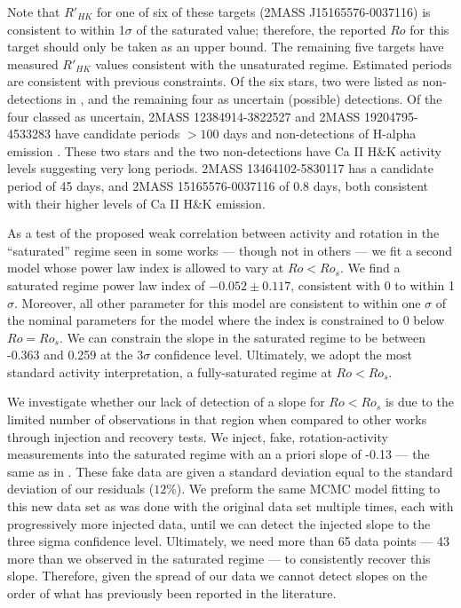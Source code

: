 Note that $R'_{HK}$ for one of six of these targets (2MASS
J15165576-0037116) is consistent to within 1$\sigma$ of the saturated value;
therefore, the reported $Ro$ for this target should only be taken as an upper
bound. The remaining five targets have measured $R'_{HK}$ values consistent
with the unsaturated regime. Estimated periods are consistent with previous
constraints. Of the six stars, two were listed as non-detections in
\citet{Newton2018}, and the remaining four as uncertain (possible) detections.
Of the four classed as uncertain, 2MASS 12384914-3822527 and 2MASS
19204795-4533283 have candidate periods $>100$ days and non-detections of
H-alpha emission \citep{Hawley96}. These two stars and the two non-detections
have Ca II H\&K activity levels suggesting very long periods. 2MASS
13464102-5830117 has a candidate period of 45 days, and 2MASS 15165576-0037116
of 0.8 days, both consistent with their higher levels of Ca II H\&K emission.

As a test of the proposed weak correlation between activity and rotation in the
``saturated'' regime seen in some works \citep{Mamajek2008,
Reiners2014, Leh20, Med20} --- though not in others \citep{Wri11, Nunez2015,
Newton2017} ---   we fit a second model whose power law index is allowed to
vary at $Ro < Ro_{s}$. We find a saturated regime power law index of
$-0.052\pm0.117$, consistent with 0 to within 1$\sigma$. Moreover,
all other parameter for this model are consistent to within one $\sigma$ of the
nominal  parameters for the model where the index is constrained to 0 below
$Ro=Ro_{s}$. We can constrain the slope in the saturated
regime to be between -0.363 and 0.259 at the $3\sigma$ confidence level.
Ultimately, we adopt the most standard activity interpretation, a
fully-saturated regime at $Ro < Ro_{s}$. 

We investigate whether our lack of detection of a slope for $Ro <
Ro_{s}$ is due to the limited number of observations in that region when
compared to other works \citep[e.g.][93 targets $Ro < Ro_{s}$]{Med20} through
injection and recovery tests. We inject, fake, rotation-activity measurements
into the saturated regime with an a priori slope of -0.13 --- the same as in
\citeauthor{Med20}. These fake data are given a standard deviation equal to the
standard deviation of our residuals ($12\%$). We preform the same MCMC model
fitting to this new data set as was done with the original data set multiple
times, each with progressively more injected data, until we can detect the
injected slope to the three sigma confidence level. Ultimately, we need more
than 65 data points --- 43 more than we observed in the saturated regime --- to
consistently recover this slope. Therefore, given the spread of our data we
cannot detect slopes on the order of what has previously been reported in the
literature.

